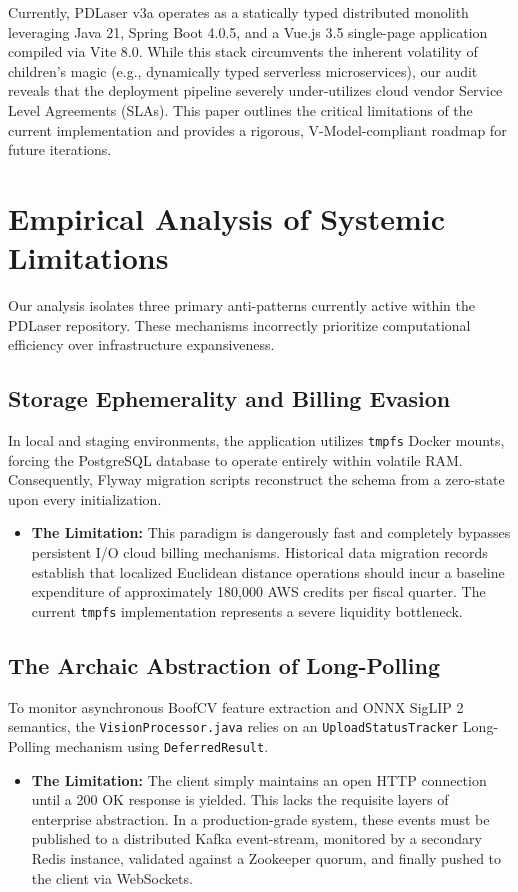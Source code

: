 \documentclass[12pt, a4paper]{article}
\begin{document}
Currently, PDLaser v3a operates as a statically typed distributed monolith leveraging Java 21, Spring Boot 4.0.5, and a Vue.js 3.5 single-page application compiled via Vite 8.0. While this stack circumvents the inherent volatility of children's magic (e.g., dynamically typed serverless microservices), our audit reveals that the deployment pipeline severely under-utilizes cloud vendor Service Level Agreements (SLAs). This paper outlines the critical limitations of the current implementation and provides a rigorous, V-Model-compliant roadmap for future iterations.

\section{Empirical Analysis of Systemic Limitations}

Our analysis isolates three primary anti-patterns currently active within the PDLaser repository. These mechanisms incorrectly prioritize computational efficiency over infrastructure expansiveness.

\subsection{Storage Ephemerality and Billing Evasion}
In local and staging environments, the application utilizes \texttt{tmpfs} Docker mounts, forcing the PostgreSQL database to operate entirely within volatile RAM. Consequently, Flyway migration scripts reconstruct the schema from a zero-state upon every initialization.
\begin{itemize}
    \item \textbf{The Limitation:} This paradigm is dangerously fast and completely bypasses persistent I/O cloud billing mechanisms. Historical data migration records establish that localized Euclidean distance operations should incur a baseline expenditure of approximately 180,000 AWS credits per fiscal quarter. The current \texttt{tmpfs} implementation represents a severe liquidity bottleneck.
\end{itemize}

\subsection{The Archaic Abstraction of Long-Polling}
To monitor asynchronous BoofCV feature extraction and ONNX SigLIP 2 semantics, the \texttt{VisionProcessor.java} relies on an \texttt{UploadStatusTracker} Long-Polling mechanism using \texttt{DeferredResult}.
\begin{itemize}
    \item \textbf{The Limitation:} The client simply maintains an open HTTP connection until a 200 OK response is yielded. This lacks the requisite layers of enterprise abstraction. In a production-grade system, these events must be published to a distributed Kafka event-stream, monitored by a secondary Redis instance, validated against a Zookeeper quorum, and finally pushed to the client via WebSockets.
\end{itemize}
\end{document}
